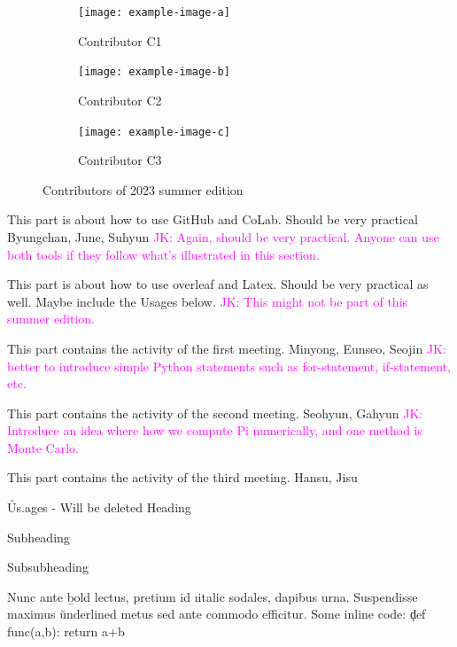 \documentclass{textbook}
\begin{document}
\begin{figure}[H]
\begin{minipage}{0.9\textwidth}
  \vspace{1cm}

  \begin{subfigure}{0.3\textwidth}
    \texttt{[image: example-image-a]}
    \caption{Contributor C1}
  \end{subfigure}
  \hfill
  \begin{subfigure}{0.3\textwidth}
    \texttt{[image: example-image-b]}
    \caption{Contributor C2}
  \end{subfigure}
  \hfill
  \begin{subfigure}{0.3\textwidth}
    \texttt{[image: example-image-c]}
    \caption{Contributor C3}
  \end{subfigure}

  \caption{Contributors of 2023 summer edition}
  \end{minipage}
\end{figure}

This part is about how to use GitHub and CoLab. Should be very practical
Byungchan, June, Suhyun
\textcolor{magenta}{JK: Again, should be very practical. Anyone can use both tools if they follow what's illustrated in this section.}

This part is about how to use overleaf and Latex. Should be very practical as well. Maybe include the Usages below.
\textcolor{magenta}{JK: This might not be part of this summer edition.}


This part contains the activity of the first meeting.
Minyong, Eunseo, Seojin
\textcolor{magenta}{JK: better to introduce simple Python statements such as for-statement, if-statement, etc.}

This part contains the activity of the second meeting.
Seohyun, Gahyun
\textcolor{magenta}{JK: Introduce an idea where how we compute Pi numerically, and one method is Monte Carlo.}

This part contains the activity of the third meeting.
Hansu, Jisu


\h{Us.ages - Will be deleted}
Heading

Subheading

Subsubheading

Nunc ante \b{bold} lectus, pretium id \i{italic} sodales, dapibus  urna. Suspendisse maximus \u{underlined} metus sed ante commodo efficitur. Some inline code: \c{def func(a,b): return a+b}
\end{document}
